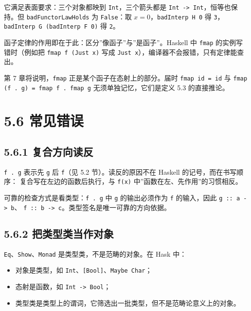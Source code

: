 它满足表面要求：三个对象都映到 \passthrough{\lstinline!Int!}，三个箭头都是 \passthrough{\lstinline!Int -> Int!}，恒等也保持。但
\passthrough{\lstinline!badFunctorLawHolds!} 为 \passthrough{\lstinline!False!}：取 \(x = 0\)，\passthrough{\lstinline!badInterp H 0!} 得 \passthrough{\lstinline!3!}，
\passthrough{\lstinline!badInterp G (badInterp F 0)!} 得 \passthrough{\lstinline!2!}。

函子定律的作用即在于此：区分''像函子''与''是函子''。Haskell 中 \passthrough{\lstinline!fmap!} 的实例写错时（例如把
\passthrough{\lstinline!fmap f (Just x)!} 写成 \passthrough{\lstinline!Just x!}），编译器不会报错，只有定律能查出。

第 7 章将说明，\passthrough{\lstinline!fmap!} 正是某个函子在态射上的部分。届时 \passthrough{\lstinline!fmap id = id!} 与
\passthrough{\lstinline!fmap (f . g) = fmap f . fmap g!} 无须单独记忆，它们是定义 5.3 的直接推论。

\section{5.6 常见错误}\label{ux5e38ux89c1ux9519ux8bef}

\subsection{5.6.1 复合方向读反}\label{ux590dux5408ux65b9ux5411ux8bfbux53cd}

\passthrough{\lstinline!f . g!} 表示先 \passthrough{\lstinline!g!} 后 \passthrough{\lstinline!f!}（见 5.2 节）。读反的原因不在 Haskell 的记号，而在书写顺序：
复合写在左边的函数后执行，与 \passthrough{\lstinline!f(x)!} 中''函数在左、先作用''的习惯相反。

可靠的检查方式是看类型：\passthrough{\lstinline!f . g!} 中 \passthrough{\lstinline!g!} 的输出必须作为 \passthrough{\lstinline!f!} 的输入，因此 \passthrough{\lstinline!g :: a -> b!}、
\passthrough{\lstinline!f :: b -> c!}。类型签名是唯一可靠的方向依据。

\subsection{5.6.2 把类型类当作对象}\label{ux628aux7c7bux578bux7c7bux5f53ux4f5cux5bf9ux8c61}

\passthrough{\lstinline!Eq!}、\passthrough{\lstinline!Show!}、\passthrough{\lstinline!Monad!} 是类型类，不是范畴的对象。在 Hask 中：

\begin{itemize}
\tightlist
\item
  对象是类型，如 \passthrough{\lstinline!Int!}、\passthrough{\lstinline![Bool]!}、\passthrough{\lstinline!Maybe Char!}；
\item
  态射是函数，如 \passthrough{\lstinline!Int -> Bool!}；
\item
  类型类是类型上的谓词，它筛选出一批类型，但不是范畴论意义上的对象。
\end{itemize}

